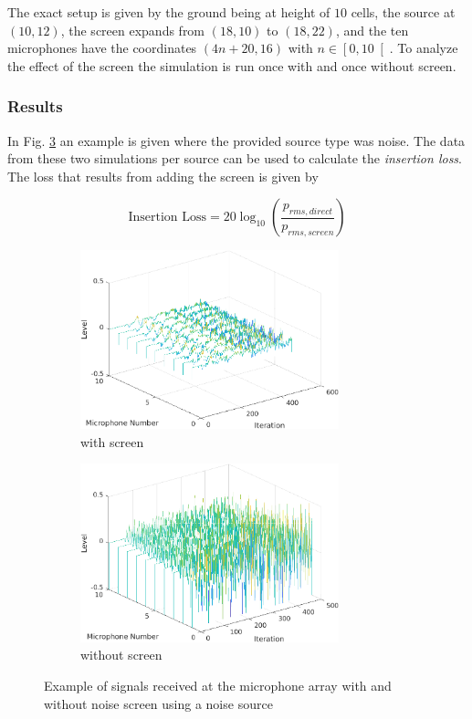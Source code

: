 \documentclass[twocolumn]{article}
\begin{document}
The exact setup is given by the ground being at height of $10$ cells, the source at $\left(10,12\right)$, the
screen expands from $\left(18,10\right)$ to $\left(18,22\right)$, and the ten microphones have the coordinates
$\left(4n+20,16\right)$ with $n\in\left[0,10\right[$.
To analyze the effect of the screen the simulation is run once with and once without screen.

\subsubsection{Results}
In Fig. \ref{fig_3_3_3d} an example is given where the provided source type was noise.
The data from these two simulations per source can be used to calculate the \textit{insertion loss}.
The loss that results from adding the screen is given by

\begin{equation}
    \text{Insertion Loss} = 20\log_{10}\left(\frac{p_{rms,direct}}{p_{rms,screen}}\right)
\end{equation}

\begin{figure}[H]
    \begin{subfigure}[]{75mm}
        \centering
        \includegraphics[width=75mm]{./Images/3_3_noise_noise_screen_3D.png}
        \caption{with screen}
        \label{fig_3_3_screen}
    \end{subfigure}
    \begin{subfigure}[]{75mm}
        \centering
        \includegraphics[width=75mm]{./Images/3_3_noise_no_screen_3D.png}
        \caption{without screen}
        \label{fig_3_3_no_screen}
    \end{subfigure}
    \caption{Example of signals received at the microphone array with and without noise screen using a noise source}
    \label{fig_3_3_3d}
\end{figure}
\end{document}

